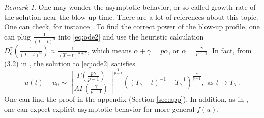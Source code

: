 \documentclass[12pt]{amsart}%
\theoremstyle{definition}
\theoremstyle{remark}
\newtheorem{rmk}[thm]{Remark}
\begin{document}
\begin{rmk}\label{rate}
One may wonder the asymptotic behavior, or so-called growth rate of the solution near the blow-up time. There are a lot of references about this topic. One can check, for instance \cite{roberts1993volterra,roberts1996growth}. To find the correct power of the blow-up profile, one can plug $\frac{1}{(T-t)^{\alpha}}$ into \eqref{eq:ode2} and use the heuristic calculation $D_c^{\gamma}(\frac{1}{(T-t)^{\alpha}})\approx \frac{1}{(T-t)^{\alpha+\gamma}}$, which means $\alpha+\gamma=p\alpha$, or $\alpha=\frac{\gamma}{p-1}$. In fact, from (3.2) in \cite{roberts1996growth}, the solution to \eqref{eq:ode2} satisfies
\begin{equation}\label{ratea}
u(t)-u_0\sim \left[\frac{\Gamma(\frac{p\gamma}{p-1})}{A\Gamma(\frac{\gamma}{p-1})}\right]^{\frac{1}{p-1}}\left((T_b-t)^{-1}-T_b^{-1}\right)^{\frac{\gamma}{p-1}},\mbox{ as }t\rightarrow T_b^-. 
\end{equation}
One can find the proof in the appendix (Section \ref{sec:app}). In addition, as in \cite{roberts1993volterra,roberts1996growth}, one can expect explicit asymptotic behavior for more general $f(u)$. 
\end{rmk}
\end{document}
